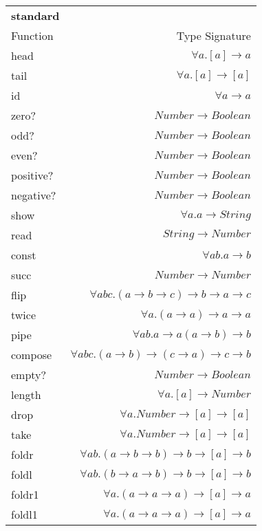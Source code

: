 \begin{longtable}{l r}
    \rowcolor{light-gray}
    \textbf{standard} & \\
    Function & Type Signature \\
    \hline
    head & $\forall a. [a] \rightarrow a$ \\
    tail & $\forall a. [a] \rightarrow [a]$ \\
    id & $\forall a \rightarrow a$ \\
    zero? &  $Number \rightarrow Boolean$ \\
    odd? & $Number \rightarrow Boolean$ \\
    even? & $Number \rightarrow Boolean$ \\
    positive? & $Number \rightarrow Boolean$ \\
    negative? & $Number \rightarrow Boolean$ \\
    show & $\forall a. a \rightarrow String$ \\
    read  & $String \rightarrow Number$ \\
    const & $\forall a b. a \rightarrow b$ \\
    succ & $Number \rightarrow Number$ \\
    flip & $\forall a b c. (a \rightarrow b \rightarrow c) \rightarrow b \rightarrow a \rightarrow c$ \\
    twice & $\forall a. (a \rightarrow a) \rightarrow a \rightarrow a$ \\
    pipe & $\forall a b. a \rightarrow a (a \rightarrow b) \rightarrow b$ \\
    compose & $\forall a b c. (a \rightarrow b) \rightarrow (c \rightarrow a) \rightarrow c \rightarrow b$\\
    empty? & $Number \rightarrow Boolean$ \\
    length & $\forall a. [a] \rightarrow Number$ \\
    drop & $\forall a. Number \rightarrow [a] \rightarrow [a]$ \\
    take & $\forall a. Number \rightarrow [a] \rightarrow [a]$ \\
    foldr & $\forall a b. (a \rightarrow b \rightarrow b) \rightarrow b \rightarrow [a] \rightarrow b$\\
    foldl & $\forall a b. (b \rightarrow a \rightarrow b) \rightarrow b \rightarrow [a] \rightarrow b$\\
    foldr1 & $\forall a. (a \rightarrow a \rightarrow a) \rightarrow [a] \rightarrow a$\\
    foldl1 & $\forall a. (a \rightarrow a \rightarrow a) \rightarrow [a] \rightarrow a$\\

\end{longtable}
